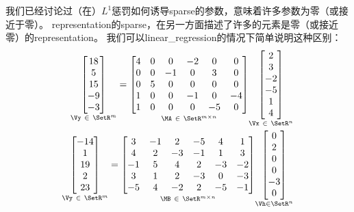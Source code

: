 我们已经讨论过（在）$L^1$惩罚如何诱导\gls{sparse}的参数，意味着许多参数为零（或接近于零）。
\gls{representation}的\gls{sparse}，在另一方面描述了许多的元素是零（或接近零）的\gls{representation}。
我们可以\gls{linear_regression}的情况下简单说明这种区别：
\begin{align}
\underset{\Vy ~\in~ \SetR^m}{
 \begin{bmatrix}
  18 \\  5 \\ 15 \\ -9 \\ -3
 \end{bmatrix}} = 
 \underset{\MA ~\in~ \SetR^{m \times n}}{
 \begin{bmatrix}
  4 & 0 & 0 & -2 & 0 & 0 \\
  0 & 0 & -1 & 0 & 3 & 0 \\
  0 & 5 & 0 & 0 & 0 & 0 \\
  1 & 0 & 0 & -1 & 0 & -4 \\
  1 & 0 & 0 & 0 & -5 & 0
 \end{bmatrix}} 
  \underset{\Vx ~\in~ \SetR^n}{
  \begin{bmatrix}
 2 \\ 3\\ -2\\ -5 \\ 1 \\ 4
 \end{bmatrix} }\\
 \underset{\Vy ~\in~ \SetR^m}{
 \begin{bmatrix}
  -14 \\  1 \\ 19 \\  2 \\ 23
 \end{bmatrix}} = 
 \underset{\MB ~\in~ \SetR^{m \times n}}{
 \begin{bmatrix}
  3 & -1 & 2 & -5 & 4 & 1 \\
  4 & 2 & -3 & -1 & 1 & 3 \\
  -1 & 5 & 4 & 2 & -3 & -2 \\
  3 & 1 & 2 & -3 & 0 & -3 \\
  -5 & 4 & -2 & 2 & -5 & -1
 \end{bmatrix}} 
  \underset{\Vh \in \SetR^n}{
  \begin{bmatrix}
 0 \\ 2 \\ 0 \\ 0 \\ -3 \\ 0
 \end{bmatrix} }
\end{align}

